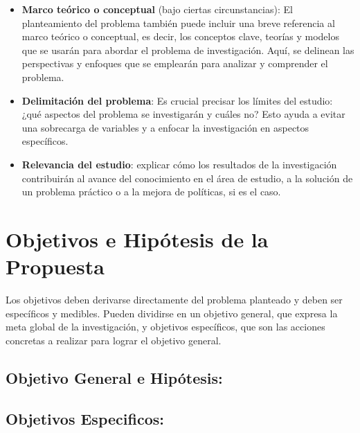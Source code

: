 \documentclass[a4paper,12pt]{article}
\begin{document}
		\begin{itemize}
			\item\textbf{ Marco teórico o conceptual }(bajo ciertas circunstancias): El planteamiento del problema también puede incluir una breve referencia al marco teórico o conceptual, es decir, los conceptos clave, teorías y modelos que se usarán para abordar el problema de investigación. Aquí, se delinean las perspectivas y enfoques que se emplearán para analizar y comprender el problema.
		\end{itemize}
		\begin{itemize}
			\item \textbf{Delimitación del problema}: Es crucial precisar los límites del estudio: ¿qué aspectos del problema se investigarán y cuáles no? Esto ayuda a evitar una sobrecarga de variables y a enfocar la investigación en aspectos específicos.
		\end{itemize}
		\begin{itemize}
			\item \textbf{Relevancia del estudio}: explicar cómo los resultados de la investigación contribuirán al avance del conocimiento en el área de estudio, a la solución de un problema práctico o a la mejora de políticas, si es el caso.
		\end{itemize}
		
	
	\section{Objetivos e Hipótesis de la Propuesta}
	
	Los objetivos deben derivarse directamente del problema planteado y deben ser específicos y medibles. Pueden dividirse en un objetivo general, que expresa la meta global de la investigación, y objetivos específicos, que son las acciones concretas a realizar para lograr el objetivo general.%
	
	
\subsection{Objetivo General e Hipótesis:} 
	
\vspace{2cm}
\subsection{Objetivos Especificos:}
\end{document}
